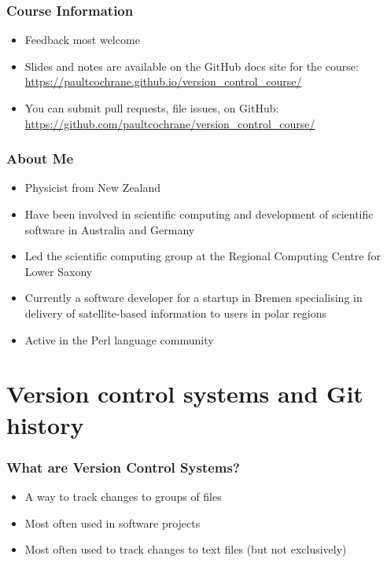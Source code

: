 \documentclass{git_course}
\begin{document}
\begin{frame}
\frametitle{Course Information}
\begin{itemize}
    \item Feedback most welcome
    \item Slides and notes are available on the GitHub docs site for the
        course:\\
        {\footnotesize \url{https://paultcochrane.github.io/version\_control\_course/}}
    \item You can submit pull requests, file issues, on GitHub:\\
        {\footnotesize \url{https://github.com/paultcochrane/version\_control\_course/}}
\end{itemize}
\end{frame}

\begin{frame}
\frametitle{About Me}
\begin{itemize}
    \item Physicist from New Zealand
    \item Have been involved in scientific computing and development of
        scientific software in Australia and Germany
    \item Led the scientific computing group at the Regional Computing
        Centre for Lower Saxony
    \item Currently a software developer for a startup in Bremen
        specialising in delivery of satellite-based information to users in
        polar regions
    \item Active in the Perl language community
\end{itemize}
\end{frame}


\section{Version control systems and Git history}

\begin{frame}
\frametitle{What are Version Control Systems?}
\begin{itemize}
    \item A way to track changes to groups of files
    \item Most often used in software projects
    \item Most often used to track changes to text files (but not
        exclusively)
\end{itemize}
\end{frame}
\end{document}
